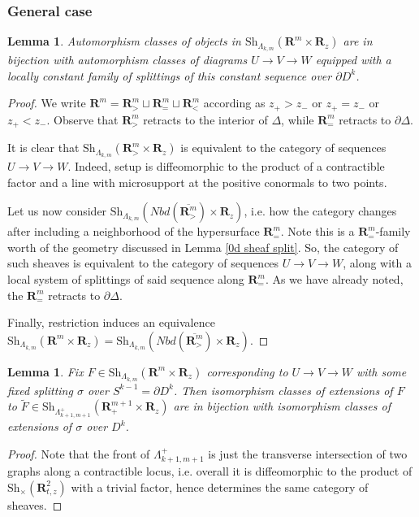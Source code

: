 \documentclass[12pt,a4paper]{article}
\numberwithin{equation}{section}
\newtheorem{lem}[equation]{Lemma}
\theoremstyle{definition}
\theoremstyle{remark}
\newcommand{\R}{\mathbf{R}}
\newcommand{\Sh}{\mathrm{Sh}}
\begin{document}
\subsubsection{General case}

\begin{lem} \label{sheaf precrossing characterization}
    Automorphism classes of objects in $\Sh_{\Lambda_{k,m}}(\R^m\times\R_z)$ are in bijection with automorphism classes of diagrams $U \to V \to W$ equipped with a locally constant family of splittings of this constant sequence over $\partial D^k$.
\end{lem}
\begin{proof}
    We write $\R^m = \R^m_{>} \sqcup \R^m_{=} \sqcup \R^m_{<}$ according as $z_+ > z_-$ or $z_+ = z_-$ or $z_+ < z_-$.  Observe that $\R^m_>$ retracts to the interior of $\Delta$, while $\R^m_=$ retracts to $\partial \Delta$.

    It is clear that $\Sh_{\Lambda_{k,m}}(\R^m_{>} \times \R_z)$ is equivalent to the category of sequences $U \to V \to W$.  Indeed, setup is diffeomorphic to the product of a contractible factor and a line with microsupport at the positive conormals to two points.

    Let us now consider $\Sh_{\Lambda_{k,m}}(Nbd(\overline{\R^m_{>}}) \times \R_z)$, i.e. how the category changes after
    including a neighborhood of the hypersurface $\R^m_{=}$.  Note this is a $\R^m_{=}$-family worth of the geometry discussed in Lemma \ref{0d sheaf split}.  So, the category of such sheaves is equivalent to the category of sequences $U \to V \to W$, along with a local system of splittings of said sequence along $\R^m_{=}$.  As we have already noted, the $\R^m_=$ retracts to $\partial \Delta$.

    Finally, restriction induces an equivalence $\Sh_{\Lambda_{k,m}}(\R^m \times \R_z) = \Sh_{\Lambda_{k,m}}(Nbd(\overline{\R^m_{>}}) \times \R_z)$.
\end{proof}

\begin{lem} \label{sheaf family splitting problem}
    Fix $F \in \Sh_{\Lambda_{k,m}}(\R^m \times \R_z)$ corresponding to $U \to V \to W$ with some fixed splitting $\sigma$ over $S^{k-1} = \partial D^k$.  Then
    isomorphism classes of extensions of $F$ to
    $\widetilde{F} \in \Sh_{\Lambda_{k+1,m+1}^+}(\R^{m+1}_+ \times \R_z)$ are in bijection with isomorphism classes of extensions of $\sigma$ over $D^k$.
\end{lem}
\begin{proof}
    Note that the front of $\Lambda_{k+1,m+1}^+$ is just the transverse intersection of two graphs along  a contractible locus, i.e. overall it is diffeomorphic to the product of $\Sh_{\times}({\R^2_{t, z}})$ with a trivial factor, hence determines the same category of sheaves.
\end{proof}
\end{document}
